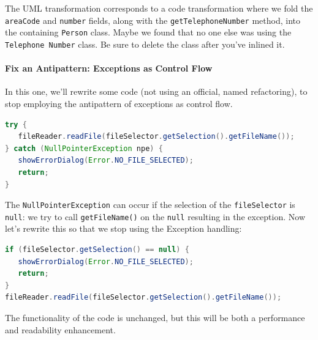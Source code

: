 The UML transformation corresponds to a code transformation where we
fold the {\tt areaCode} and {\tt number} fields, along with the
{\tt getTelephoneNumber} method, into the containing {\tt Person} class.
Maybe we found that no one else was using the {\tt Telephone Number} class.
Be sure to delete the class after you've inlined it.

\paragraph{Fix an Antipattern: Exceptions as Control Flow}
In this one, we'll rewrite some code (not using an official, named refactoring), to stop employing the antipattern of exceptions as control flow.

\begin{lstlisting}[language={Java}]
try {
   fileReader.readFile(fileSelector.getSelection().getFileName());
} catch (NullPointerException npe) {
   showErrorDialog(Error.NO_FILE_SELECTED);
   return;
}
\end{lstlisting} 

The \texttt{NullPointerException} can occur if the selection of the \texttt{fileSelector} is \texttt{null}: we try to call \texttt{getFileName()} on the \texttt{null} resulting in the exception. Now let's rewrite this so that we stop using the Exception handling:

\begin{lstlisting}[language={Java}]
if (fileSelector.getSelection() == null) {
   showErrorDialog(Error.NO_FILE_SELECTED);
   return;
}
fileReader.readFile(fileSelector.getSelection().getFileName());
\end{lstlisting} 

The functionality of the code is unchanged, but this will be both a performance and readability enhancement.






